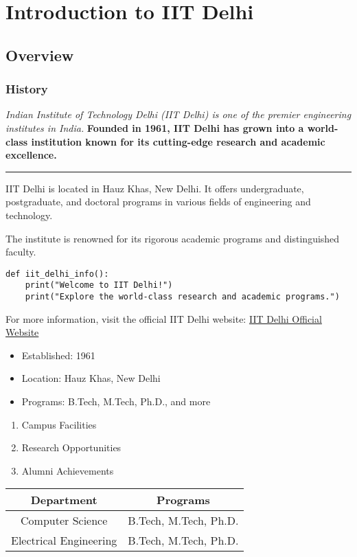 

\section{Introduction to IIT Delhi}
\subsection{Overview}
\subsubsection{History}

\textit{Indian Institute of Technology Delhi (IIT Delhi) is one of the premier engineering institutes in India.}
\textbf{Founded in 1961, IIT Delhi has grown into a world-class institution known for its cutting-edge research and academic excellence.}

\hrule

IIT Delhi is located in Hauz Khas, New Delhi. It offers undergraduate, postgraduate, and doctoral programs in various fields of engineering and technology.\par
The institute is renowned for its rigorous academic programs and distinguished faculty.

\begin{verbatim}
def iit_delhi_info():
    print("Welcome to IIT Delhi!")
    print("Explore the world-class research and academic programs.")
\end{verbatim}

For more information, visit the official IIT Delhi website: \href{https://www.iitd.ac.in}{IIT Delhi Official Website}


\begin{itemize}
    \item Established: 1961
    \item Location: Hauz Khas, New Delhi
    \item Programs: B.Tech, M.Tech, Ph.D., and more
\end{itemize}

\begin{enumerate}
    \item Campus Facilities
    \item Research Opportunities
    \item Alumni Achievements
\end{enumerate}

\begin{table}
\begin{tabular}{|c|c|}
\hline
Department & Programs \\
\hline
Computer Science & B.Tech, M.Tech, Ph.D. \\
Electrical Engineering & B.Tech, M.Tech, Ph.D. \\
\hline
\end{tabular}
\end{table}


